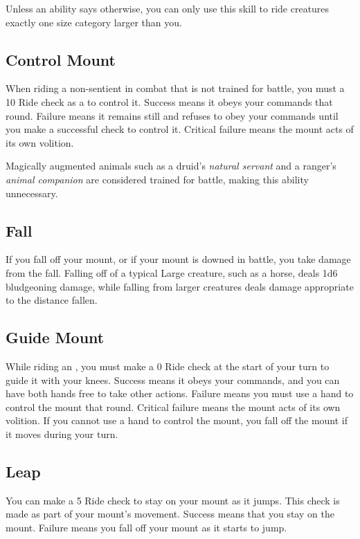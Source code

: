         Unless an ability says otherwise, you can only use this skill to ride creatures exactly one size category larger than you.

    \subsection{Control Mount}
        When riding a non-sentient  in combat that is not trained for battle, you must a  10 Ride check as a  to control it. Success means it obeys your commands that round. Failure means it remains still and refuses to obey your commands until you make a successful check to control it. Critical failure means the mount acts of its own volition.

        Magically augmented animals such as a druid's \textit{natural servant} and a ranger's \textit{animal companion} are considered trained for battle, making this ability unnecessary.

    \subsection{Fall}
        If you fall off your mount, or if your mount is downed in battle, you take damage from the fall.
        Falling off of a typical Large creature, such as a horse, deals 1d6 bludgeoning damage, while falling from larger creatures deals damage appropriate to the distance fallen.

    \subsection{Guide Mount}
        While riding an , you must make a  0 Ride check at the start of your turn to guide it with your knees. Success means it obeys your commands, and you can have both hands free to take other actions. Failure means you must use a hand to control the mount that round. Critical failure means the mount acts of its own volition. If you cannot use a hand to control the mount, you fall off the mount if it moves during your turn.

    \subsection{Leap}
        You can make a  5 Ride check to stay on your mount as it jumps. This check is made as part of your mount's movement. Success means that you stay on the mount. Failure means you fall off your mount as it starts to jump.

